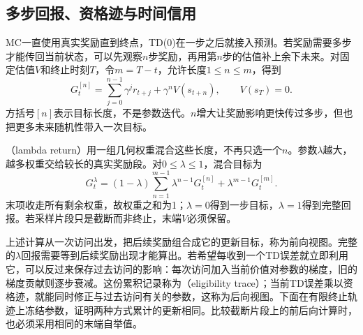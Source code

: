 \subsection{多步回报、资格迹与时间信用}
\label{sec:rl-learning-traces}

MC一直使用真实奖励直到终点，TD(0)在一步之后就接入预测。若奖励需要多步才能传回当前状态，可以先观察$n$步奖励，再用第$n$步的估值补上余下未来。对固定估值$V$和终止时刻$T$，令$m=T-t$，允许长度$1\leq n\leq m$，得到
\begin{equation}
  G_t^{[n]}=\sum_{j=0}^{n-1}\gamma^j r_{t+j}
                    +\gamma^n V(s_{t+n}),\qquad V(s_T)=0.
  \label{eq:rl-learning-n-step}
\end{equation}
方括号$[n]$表示目标长度，不是参数迭代。$n$增大让奖励影响更快传过多步，但也把更多未来随机性带入一次目标。

（lambda return）用一组几何权重混合这些长度，不再只选一个$n$。参数$\lambda$越大，越多权重交给较长的真实奖励段。对$0\leq\lambda\leq1$，混合目标为
\begin{equation}
  G_t^\lambda
    =(1-\lambda)\sum_{n=1}^{m-1}\lambda^{n-1}G_t^{[n]}
                     +\lambda^{m-1}G_t^{[m]} .
  \label{eq:rl-learning-lambda-return}
\end{equation}
末项收走所有剩余权重，故权重之和为1；$\lambda=0$得到一步目标，$\lambda=1$得到完整回报。若采样片段只是截断而非终止，末端$V$必须保留。

上述计算从一次访问出发，把后续奖励组合成它的更新目标，称为前向视图。完整的$\lambda$回报需要等到后续奖励出现才能算出。若希望每收到一个TD误差就立即利用它，可以反过来保存过去访问的影响：每次访问加入当前价值对参数的梯度，旧的梯度贡献则逐步衰减。这份累积记录称为（eligibility trace）；当前TD误差乘以资格迹，就能同时修正与过去访问有关的参数，这称为后向视图。下面在有限终止轨迹上冻结参数，证明两种方式累计的更新相同。比较截断片段上的前后向计算时，也必须采用相同的末端自举值。

